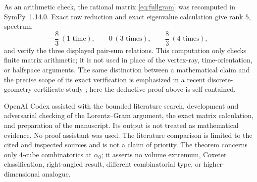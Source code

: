 \documentclass[11pt]{article}
\begin{document}
As an arithmetic check, the rational matrix \eqref{eq:fullgram} was
recomputed in SymPy~1.14.0.  Exact row reduction and exact eigenvalue
calculation give rank $5$, spectrum
\[
 -\frac83\ (1\text{ time}),\qquad 0\ (3\text{ times}),\qquad
 \frac83\ (4\text{ times}),
\]
and verify the three displayed pair-sum relations.  This computation
only checks finite matrix arithmetic; it is not used in place of the
vertex-ray, time-orientation, or halfspace arguments.  The same
distinction between a mathematical claim and the precise scope of its
exact verification is emphasized in a recent discrete-geometry
certificate study \cite{ZengEtAl2026Certificates}; here the deductive
proof above is self-contained.

OpenAI Codex assisted with the bounded literature search, development
and adversarial checking of the Lorentz--Gram argument, the exact
matrix calculation, and preparation of the manuscript.  Its output is
not treated as mathematical evidence.  No proof assistant was used.
The literature comparison is limited to the cited and inspected
sources and is not a claim of priority.  The theorem concerns only
$4$-cube combinatorics at $\alpha_0$; it asserts no volume extremum,
Coxeter classification, right-angled result, different combinatorial
type, or higher-dimensional analogue.



\end{document}
